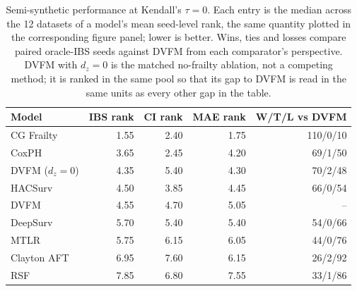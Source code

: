 \begin{table}
\caption{Semi-synthetic performance at Kendall's $\tau=0$. Each entry is the median across the 12 datasets of a model's mean seed-level rank, the same quantity plotted in the corresponding figure panel; lower is better. Wins, ties and losses compare paired oracle-IBS seeds against DVFM from each comparator's perspective. DVFM with $d_z=0$ is the matched no-frailty ablation, not a competing method; it is ranked in the same pool so that its gap to DVFM is read in the same units as every other gap in the table.}
\label{tab:semi_synthetic_models_tau0}
\begin{tabular}{lrrrr}
\toprule
Model & IBS rank & CI rank & MAE rank & W/T/L vs DVFM \\
\midrule
CG Frailty & 1.55 & 2.40 & 1.75 & 110/0/10 \\
CoxPH & 3.65 & 2.45 & 4.20 & 69/1/50 \\
DVFM ($d_z{=}0$) & 4.35 & 5.40 & 4.30 & 70/2/48 \\
HACSurv & 4.50 & 3.85 & 4.45 & 66/0/54 \\
DVFM & 4.55 & 4.70 & 5.05 & -- \\
DeepSurv & 5.70 & 5.40 & 5.40 & 54/0/66 \\
MTLR & 5.75 & 6.15 & 6.05 & 44/0/76 \\
Clayton AFT & 6.95 & 7.60 & 6.15 & 26/2/92 \\
RSF & 7.85 & 6.80 & 7.55 & 33/1/86 \\
\bottomrule
\end{tabular}
\end{table}
